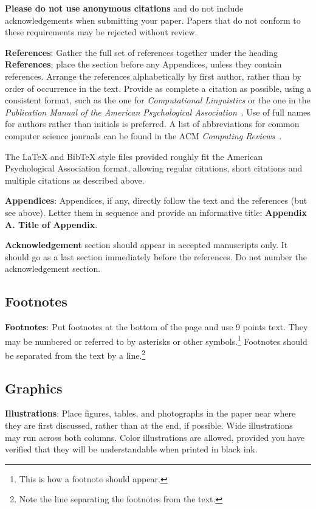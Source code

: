 \documentclass[11pt]{article}
\begin{document}
\textbf{Please do not  use anonymous citations} and  do not include acknowledgements 
when submitting your paper. Papers that do not conform
to these requirements may be rejected without review. 

\textbf{References}: Gather the full set of references together under
the heading {\bf References}; place the section before any Appendices,
unless they contain references. Arrange the references alphabetically
by first author, rather than by order of occurrence in the text.
Provide as complete a citation as possible, using a consistent format,
such as the one for {\em Computational Linguistics\/} or the one in the 
{\em Publication Manual of the American 
Psychological Association\/}~\cite{APA:83}.  Use of full names for
authors rather than initials is preferred.  A list of abbreviations
for common computer science journals can be found in the ACM 
{\em Computing Reviews\/}~\cite{ACM:83}.

The \LaTeX{} and Bib\TeX{} style files provided roughly fit the
American Psychological Association format, allowing regular citations, 
short citations and multiple citations as described above.

{\bf Appendices}: Appendices, if any, directly follow the text and the
references (but see above).  Letter them in sequence and provide an
informative title: {\bf Appendix A. Title of Appendix}.

\textbf{Acknowledgement} section should appear in accepted manuscripts
only. It should go as a last section immediately
before the references.  Do not number the acknowledgement section.

\subsection{Footnotes}

{\bf Footnotes}: Put footnotes at the bottom of the page and use 9
points text. They may be numbered or referred to by asterisks or other
symbols.\footnote{This is how a footnote should appear.} Footnotes
should be separated from the text by a line.\footnote{Note the line
separating the footnotes from the text.}

\subsection{Graphics}

{\bf Illustrations}: Place figures, tables, and photographs in the
paper near where they are first discussed, rather than at the end, if
possible.  Wide illustrations may run across both columns.  Color
illustrations are allowed, provided you have verified that  
they will be understandable when printed in black ink.
\end{document}
